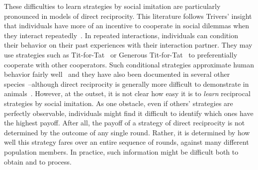 \documentclass[11pt]{article}
\theoremstyle{plainCl1}
\theoremstyle{plainCl2}
\begin{document}
These difficulties to learn strategies by social imitation are particularly pronounced in models of direct reciprocity. 
This literature follows Trivers' insight that individuals have more of an incentive to cooperate in social dilemmas when they interact repeatedly~\citep{trivers1971evolution}. 
In repeated interactions, individuals can condition their behavior on their past experiences with their interaction partner. 
They may use strategies such as Tit-for-Tat~\citep{rapoport:book:1965,axelrod1981evolution} or Generous Tit-for-Tat~\citep{molander:jcr:1985,Nowak1992tit} to preferentially cooperate with other cooperators. 
Such conditional strategies approximate human behavior fairly well~\citep{fischbacher:EconL:2001,Rand:TCS:2013,DalBo:AER:2019,Montero-Porras:SciRep:2022,Rossetti:ETH:2023} and they have also been documented in several other species~\citep{Carter:PRSB:2013,Schweinfurth:AnBehav:2019,Voelkl:PNAS:2015}--although direct reciprocity is generally more difficult to demonstrate in animals~\citep{CluttonBrock:Nature:2009,Silk:CurrentBiology:2013,taborsky:CurrentBiology:2013}.
However, at the outset, it is not clear how easy it is to {\it learn} reciprocal strategies by social imitation. 
As one obstacle, even if others' strategies are perfectly observable, individuals might find it difficult to identify which ones have the highest payoff. 
After all, the payoff of a strategy of direct reciprocity is not determined by the outcome of any single round.
Rather, it is determined by how well this strategy fares over an entire sequence of rounds, against many different population members. 
In practice, such information might be difficult both to obtain and to process. 

\end{document}
